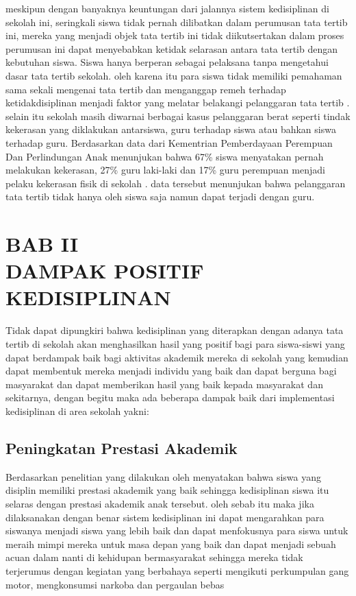 \documentclass[f4paper,12pt, left=3cm,right=2cm,bottom=2cm, bahasa]{article}
\begin{document}
meskipun dengan banyaknya keuntungan dari jalannya sistem kedisiplinan di sekolah ini, seringkali siswa tidak pernah dilibatkan dalam perumusan tata tertib ini, mereka yang menjadi objek tata tertib ini tidak diikutsertakan dalam proses perumusan ini dapat menyebabkan ketidak selarasan antara tata tertib dengan kebutuhan siswa. Siswa hanya berperan sebagai pelaksana tanpa mengetahui dasar tata tertib sekolah. oleh karena itu para siswa tidak memiliki pemahaman sama sekali mengenai tata tertib dan menganggap remeh terhadap ketidakdisiplinan menjadi faktor yang melatar belakangi pelanggaran tata tertib \cite{anzalena2019faktor} . selain itu sekolah masih diwarnai berbagai kasus pelanggaran berat seperti tindak kekerasan yang diklakukan antarsiswa, guru terhadap siswa atau bahkan siswa terhadap guru. Berdasarkan data dari Kementrian Pemberdayaan Perempuan Dan Perlindungan Anak menunjukan bahwa 67\% siswa menyatakan pernah melakukan kekerasan, 27\% guru laki-laki dan 17\% guru perempuan menjadi pelaku kekerasan fisik di sekolah \cite{widodo2017sekolah}. data tersebut menunjukan bahwa pelanggaran tata tertib tidak hanya oleh siswa saja namun dapat terjadi dengan guru. 



\pagebreak

\section*{BAB II \\ DAMPAK POSITIF KEDISIPLINAN}
\setcounter{section}{2}
Tidak dapat dipungkiri bahwa kedisiplinan yang diterapkan dengan adanya tata tertib di sekolah akan menghasilkan hasil yang positif bagi para siswa-siswi yang dapat berdampak baik bagi aktivitas akademik mereka di sekolah yang kemudian dapat membentuk mereka menjadi individu yang baik dan dapat berguna bagi masyarakat dan dapat memberikan hasil yang baik kepada masyarakat dan sekitarnya, dengan begitu maka ada beberapa dampak baik dari implementasi kedisiplinan di area sekolah yakni:
\subsection{Peningkatan Prestasi Akademik}
Berdasarkan penelitian yang dilakukan oleh  \cite{zimmerman2014comparing} menyatakan bahwa siswa yang disiplin memiliki prestasi akademik yang baik sehingga kedisiplinan siswa itu selaras dengan prestasi akademik anak tersebut. oleh sebab itu maka jika dilaksanakan dengan benar sistem kedisiplinan ini dapat mengarahkan para siswanya menjadi siswa yang lebih baik dan dapat menfokusnya para siswa untuk meraih mimpi mereka untuk masa depan yang baik dan dapat menjadi sebuah acuan dalam nanti di kehidupan bermasyarakat sehingga mereka tidak terjerumus dengan kegiatan yang berbahaya seperti mengikuti perkumpulan gang motor, mengkonsumsi narkoba dan pergaulan bebas \cite{ariananda2014pengaruh}
\end{document}
